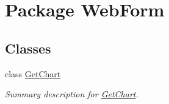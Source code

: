 \hypertarget{namespace_web_form}{\section{Package Web\-Form}
\label{namespace_web_form}
}
\subsection*{Classes}
\begin{DoxyCompactItemize}
\item 
class \hyperlink{class_web_form_1_1_get_chart}{Get\-Chart}
\begin{DoxyCompactList}\small\item\em Summary description for \hyperlink{class_web_form_1_1_get_chart}{Get\-Chart}. \end{DoxyCompactList}\end{DoxyCompactItemize}
